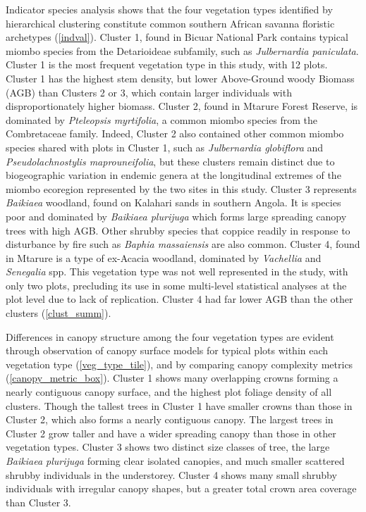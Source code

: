 \documentclass[11pt,a4paper]{article}
\begin{document}
Indicator species analysis shows that the four vegetation types identified by hierarchical clustering constitute common southern African savanna floristic archetypes (\autoref{indval}). Cluster 1, found in Bicuar National Park contains typical miombo species from the Detarioideae subfamily, such as \textit{Julbernardia paniculata}. Cluster 1 is the most frequent vegetation type in this study, with 12 plots. Cluster 1 has the highest stem density, but lower Above-Ground woody Biomass (AGB) than Clusters 2 or 3, which contain larger individuals with disproportionately higher biomass. Cluster 2, found in Mtarure Forest Reserve, is dominated by \textit{Pteleopsis myrtifolia}, a common miombo species from the Combretaceae family. Indeed, Cluster 2 also contained other common miombo species shared with plots in Cluster 1, such as \textit{Julbernardia globiflora} and \textit{Pseudolachnostylis maprouneifolia}, but these clusters remain distinct due to biogeographic variation in endemic genera at the longitudinal extremes of the miombo ecoregion represented by the two sites in this study. Cluster 3 represents \textit{Baikiaea} woodland, found on Kalahari sands in southern Angola. It is species poor and dominated by \textit{Baikiaea plurijuga} which forms large spreading canopy trees with high AGB. Other shrubby species that coppice readily in response to disturbance by fire such as \textit{Baphia massaiensis} are also common. Cluster 4, found in Mtarure is a type of ex-Acacia woodland, dominated by \textit{Vachellia} and \textit{Senegalia} spp. This vegetation type was not well represented in the study, with only two plots, precluding its use in some multi-level statistical analyses at the plot level due to lack of replication. Cluster 4 had far lower AGB than the other clusters (\autoref{clust_summ}). 

Differences in canopy structure among the four vegetation types are evident through observation of canopy surface models for typical plots within each vegetation type (\autoref{veg_type_tile}), and by comparing canopy complexity metrics (\autoref{canopy_metric_box}). Cluster 1 shows many overlapping crowns forming a nearly contiguous canopy surface, and the highest plot foliage density of all clusters. Though the tallest trees in Cluster 1 have smaller crowns than those in Cluster 2, which also forms a nearly contiguous canopy. The largest trees in Cluster 2 grow taller and have a wider spreading canopy than those in other vegetation types. Cluster 3 shows two distinct size classes of tree, the large \textit{Baikiaea plurijuga} forming clear isolated canopies, and much smaller scattered shrubby individuals in the understorey. Cluster 4 shows many small shrubby individuals with irregular canopy shapes, but a greater total crown area coverage than Cluster 3. 
\end{document}
